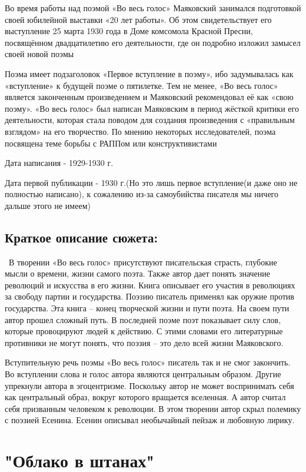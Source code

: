 \documentclass[a4paper,12pt]{article}
\begin{document}
	\noindent
	Во время работы над поэмой «Во весь голос» Маяковский занимался подготовкой своей юбилейной выставки «20 лет работы». Об этом свидетельствует его выступление 25 марта 1930 года в Доме комсомола Красной Пресни, посвящённом двадцатилетию его деятельности, где он подробно изложил замысел своей новой поэмы
	
	
	\noindent
	Поэма имеет подзаголовок «Первое вступление в поэму», ибо задумывалась как «вступление» к будущей поэме о пятилетке. Тем не менее, «Во весь голос» является законченным произведением и Маяковский рекомендовал её как «свою поэму». «Во весь голос» был написан Маяковским в период жёсткой критики его деятельности, которая стала поводом для создания произведения с «правильным взглядом» на его творчество. По мнению некоторых исследователей, поэма посвящена теме борьбы с РАППом или конструктивистами
	
	\noindent
	Дата написания - 1929-1930 г.
	
	\noindent
	Дата первой публикации - 1930 г.(Но это лишь первое вступление(и даже оно не полностью написано), к сожалению из-за самоубийства писателя мы ничего дальше этого не имеем)
	
	\subsection{Краткое описание сюжета: }
	\quad \, В творении «Во весь голос» присутствуют писательская страсть, глубокие мысли о времени, жизни самого поэта. Также автор дает понять значение революций и искусства в его жизни. Книга описывает его участия в революциях за свободу партии и государства. Поэзию писатель применял как оружие против государства. Эта книга – конец творческой жизни и пути поэта. На своем пути автор прошел сложный путь. В последней поэме поэт показывает силу слов, которые провоцируют людей к действию. С этими словами его литературные противники не могут понять, что поэзия – это дело всей жизни Маяковского.
	
	Вступительную речь поэмы «Во весь голос» писатель так и не смог закончить. Во вступлении слова и голос автора являются центральным образом. Другие упрекнули автора в эгоцентризме. Поскольку автор не может воспринимать себя как центральный образ, вокруг которого вращается вселенная. А автор считал себя призванным человеком к революции. В этом творении автор скрыл полемику с поэзией Есенина. Есенин описывал необычайный пейзаж и любовную лирику.
	
	\section{"Облако в штанах"}
\end{document}
